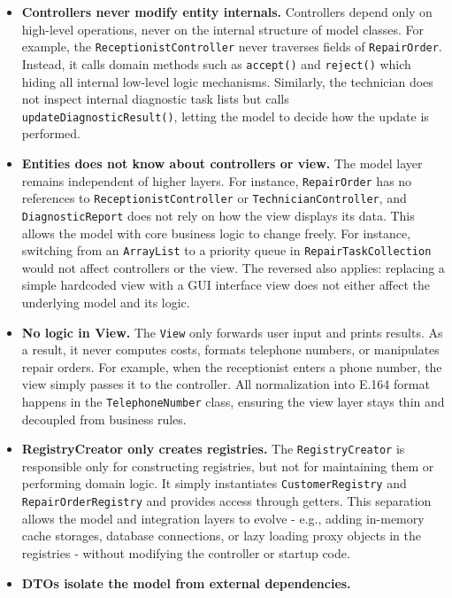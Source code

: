 \documentclass[a4paper]{scrartcl}
\begin{document}
\begin{itemize}
  \item \textbf{Controllers never modify entity internals.}  
        Controllers depend only on high-level operations, never on the internal structure of model classes. For example, the \texttt{ReceptionistController} never traverses fields of \texttt{RepairOrder}. Instead, it calls domain methods such as \texttt{accept()} and \texttt{reject()} which hiding all internal low-level logic mechanisms. Similarly, the technician does not inspect internal diagnostic task lists but calls \texttt{updateDiagnosticResult()}, letting the model to decide how the update is performed.
  \item \textbf{Entities does not know about controllers or view.}  
        The model layer remains independent of higher layers. For instance, \texttt{RepairOrder} has no references to \texttt{ReceptionistController} or \texttt{TechnicianController}, and \texttt{DiagnosticReport} does not rely on how the view displays its data. This allows the model with core business logic to change freely. For instance, switching from an \texttt{ArrayList} to a priority queue in \texttt{RepairTaskCollection} would not affect controllers or the view. The reversed also applies: replacing a simple hardcoded view with a GUI interface view does not either affect the underlying model and its logic.
  \item \textbf{No logic in View.}  
        The \texttt{View} only forwards user input and prints results. As a result, it never computes costs, formats telephone numbers, or manipulates repair orders. For example, when the receptionist enters a phone number, the view simply passes it to the controller. All normalization into E.164 format happens in the \texttt{TelephoneNumber} class, ensuring the view layer stays thin and decoupled from business rules.
  \item \textbf{RegistryCreator only creates registries.}  
        The \texttt{RegistryCreator} is responsible only for constructing registries, but not for maintaining them or performing domain logic. It simply instantiates \texttt{CustomerRegistry} and \texttt{RepairOrderRegistry} and provides access through getters. This separation allows the model and integration layers to evolve - e.g., adding in-memory cache storages, database connections, or lazy loading proxy objects in the registries - without modifying the controller or startup code.
  \item \textbf{DTOs isolate the model from external dependencies.}  

\end{itemize}
\end{document}
